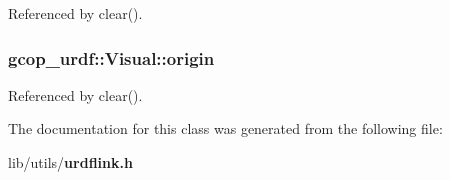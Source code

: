 \-Referenced by clear().

\subsubsection[{origin}]{ {\bf gcop\-\_\-urdf\-::\-Visual\-::origin}}\label{classgcop__urdf_1_1Visual_a5758c40737bcc59dc069b5828d0de02d}


\-Referenced by clear().



\-The documentation for this class was generated from the following file\-:\begin{DoxyCompactItemize}
\item 
lib/utils/{\bf urdflink.\-h}\end{DoxyCompactItemize}
